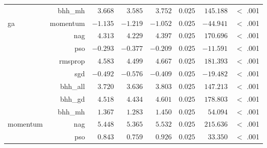\begin{table}[htb]
{\begin{tabular}{lrrrrrrr}
			                     & bhh\_mh              & $3.668$              & $3.585$                                         & $3.752$              & $0.025$              & $145.188$            & $<$ .001    \\
			ga                   & momentum             & $-1.135$             & $-1.219$                                        & $-1.052$             & $0.025$              & $-44.941$            & $<$ .001    \\
			$ $                  & nag                  & $4.313$              & $4.229$                                         & $4.397$              & $0.025$              & $170.696$            & $<$ .001    \\
			                     & pso                  & $-0.293$             & $-0.377$                                        & $-0.209$             & $0.025$              & $-11.591$            & $<$ .001    \\
			                     & rmsprop              & $4.583$              & $4.499$                                         & $4.667$              & $0.025$              & $181.393$            & $<$ .001    \\
			                     & sgd                  & $-0.492$             & $-0.576$                                        & $-0.409$             & $0.025$              & $-19.482$            & $<$ .001    \\
			                     & bhh\_all             & $3.720$              & $3.636$                                         & $3.803$              & $0.025$              & $147.213$            & $<$ .001    \\
			                     & bhh\_gd              & $4.518$              & $4.434$                                         & $4.601$              & $0.025$              & $178.803$            & $<$ .001    \\
			                     & bhh\_mh              & $1.367$              & $1.283$                                         & $1.450$              & $0.025$              & $54.094$             & $<$ .001    \\
			momentum             & nag                  & $5.448$              & $5.365$                                         & $5.532$              & $0.025$              & $215.636$            & $<$ .001    \\
			$ $                  & pso                  & $0.843$              & $0.759$                                         & $0.926$              & $0.025$              & $33.350$             & $<$ .001    \\

\end{tabular}}
\end{table}
